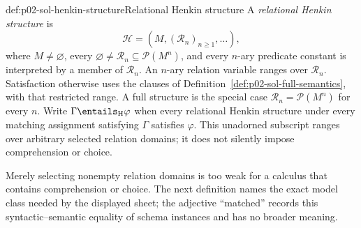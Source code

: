 \begin{hbdefinition}{def:p02-sol-henkin-structure}{Relational Henkin structure}
A \emph{relational Henkin structure} is
\[
 \mathcal H=(M,(\mathcal R_n)_{n\geq1},\ldots),
\]
where \(M\ne\varnothing\), every
\(\varnothing\ne\mathcal R_n\subseteq\mathcal P(M^n)\), and every
\(n\)-ary predicate constant is interpreted by a member of
\(\mathcal R_n\).  An \(n\)-ary relation variable ranges over
\(\mathcal R_n\).  Satisfaction otherwise uses the clauses of
Definition~\ref{def:p02-sol-full-semantics}, with that restricted range.
A full structure is the special case
\(\mathcal R_n=\mathcal P(M^n)\) for every \(n\).
Write \(\Gamma\entails_{\mathrm H}\varphi\) when every relational Henkin
structure under every matching assignment satisfying \(\Gamma\) satisfies
\(\varphi\).  This unadorned subscript ranges over arbitrary selected
relation domains; it does not silently impose comprehension or choice.
\end{hbdefinition}

Merely selecting nonempty relation domains is too weak for a calculus that
contains comprehension or choice.  The next definition names the exact model
class needed by the displayed sheet; the adjective ``matched'' records this
syntactic--semantic equality of schema instances and has no broader meaning.

